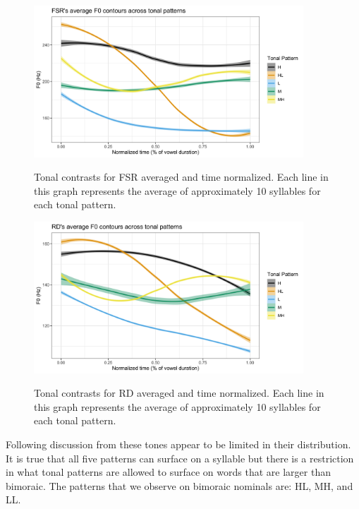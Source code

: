 \documentclass[12pt, letterpaper]{article}
\begin{document}
\begin{figure}[!ht]
	\centering
	\includegraphics[width=0.9\textwidth]{../FSRTonePlot.png}
	\label{fig:FSRTonePlot}
	\caption{Tonal contrasts for FSR averaged and time normalized. Each line in this graph represents the average of approximately 10 syllables for each tonal pattern. }
\end{figure}

\begin{figure}[!ht]
	\centering
	\includegraphics[width=0.9\textwidth]{../RDTonePlot.png}
	\label{fig:RDTonePlot}
	\caption{Tonal contrasts for RD averaged and time normalized. Each line in this graph represents the average of approximately 10 syllables for each tonal pattern.}
\end{figure}

Following discussion from \citet{brinkerhoffTonalPatternsTheir2022} these tones appear to be limited in their distribution. It is true that all five patterns can surface on a syllable but there is a restriction in what tonal patterns are allowed to surface on words that are larger than bimoraic. The patterns that we observe on bimoraic nominals are: HL, MH, and LL.
\end{document}
